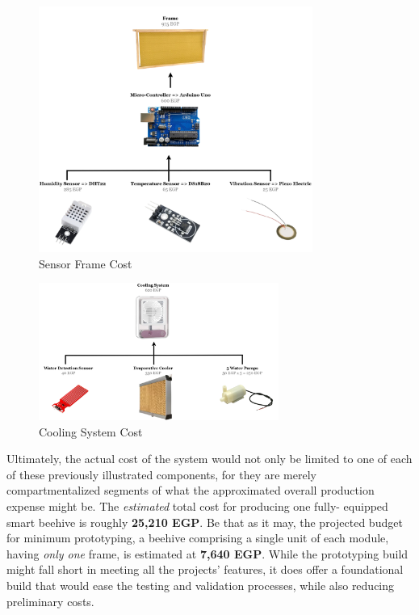 \documentclass[12pt]{article}
\begin{document}
	\begin{figure}[H]
		\centering
		\includegraphics[width=0.8\textwidth]{Images/Components/Frame Cost.png}
		\caption{Sensor Frame Cost }
		\label{fig:FRAME_COST}
	\end{figure}
	\vspace{0.3 cm}
	\begin{figure}[H]
		\centering
		\includegraphics[width=0.7\textwidth]{Images/Components/Cooling System Cost.png}
		\caption{Cooling System Cost }
		\label{fig:COOLING_COST}
	\end{figure}
	\newpage
	\vspace{1 cm}
	\hspace{-0.65 cm}Ultimately, the actual cost of the system would not only be limited to one of each of these previously illustrated components, for they are merely compartmentalized segments of what the approximated overall production expense might be. The \textit{estimated} total cost for producing one fully- equipped smart beehive is roughly \textbf{25,210 EGP}. Be that as it may, the projected budget for minimum prototyping, a beehive comprising a single unit of each module, having  \textit{only one} frame, is estimated at \textbf{7,640 EGP}. While the prototyping build might fall short in meeting all the projects' features, it does offer a foundational build that would ease the testing and validation processes, while also reducing preliminary costs.
\end{document}
